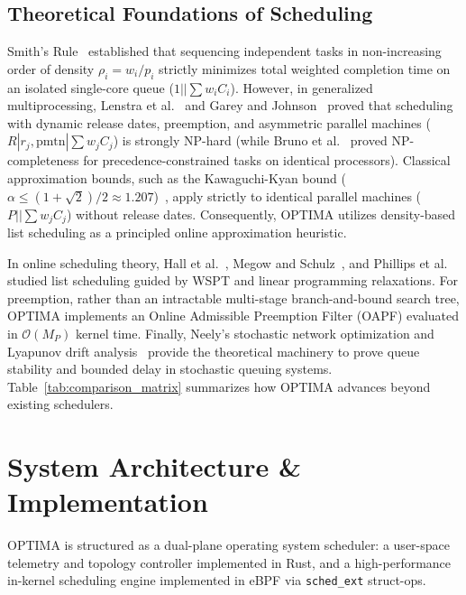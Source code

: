 \documentclass[letterpaper,twocolumn,10pt]{article}
\begin{document}
\subsection{Theoretical Foundations of Scheduling}
Smith's Rule~\cite{smith1956various} established that sequencing independent tasks in non-increasing order of density $\rho_i = w_i / p_i$ strictly minimizes total weighted completion time on an isolated single-core queue ($1 || \sum w_i C_i$). However, in generalized multiprocessing, Lenstra et al.~\cite{lenstra1977complexity} and Garey and Johnson~\cite{garey1979computers} proved that scheduling with dynamic release dates, preemption, and asymmetric parallel machines ($R | r_j, \text{pmtn} | \sum w_j C_j$) is strongly NP-hard (while Bruno et al.~\cite{bruno1974sequencing} proved NP-completeness for precedence-constrained tasks on identical processors). Classical approximation bounds, such as the Kawaguchi-Kyan bound ($\alpha \le (1+\sqrt{2})/2 \approx 1.207$)~\cite{kawaguchi1986worst}, apply strictly to identical parallel machines ($P || \sum w_j C_j$) without release dates. Consequently, OPTIMA utilizes density-based list scheduling as a principled online approximation heuristic. 

In online scheduling theory, Hall et al.~\cite{hall1997scheduling}, Megow and Schulz~\cite{megow2004online}, and Phillips et al.~\cite{phillips1998minimizing} studied list scheduling guided by WSPT and linear programming relaxations. For preemption, rather than an intractable multi-stage branch-and-bound search tree, OPTIMA implements an Online Admissible Preemption Filter (OAPF) evaluated in $\mathcal{O}(M_P)$ kernel time. Finally, Neely's stochastic network optimization and Lyapunov drift analysis~\cite{neely2010stochastic,neely2006energy,georgiadis2006resource} provide the theoretical machinery to prove queue stability and bounded delay in stochastic queuing systems. Table~\ref{tab:comparison_matrix} summarizes how OPTIMA advances beyond existing schedulers.

\section{System Architecture \& Implementation}
\label{sec:architecture}

OPTIMA is structured as a dual-plane operating system scheduler: a user-space telemetry and topology controller implemented in Rust, and a high-performance in-kernel scheduling engine implemented in eBPF via \texttt{sched\_ext} struct-ops.
\end{document}
